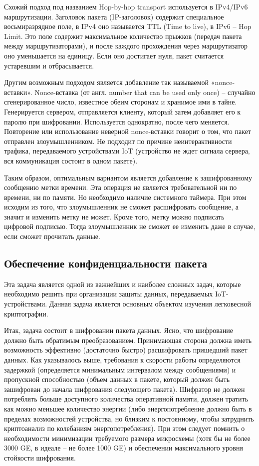 Схожий подход под названием Hop-by-hop transport \cite{src29} используется в IPv4/IPv6 маршрутизации. Заголовок пакета (IP-заголовок) содержит специальное восьмиразрядное поле, в IPv4 оно называется TTL (Time to live), в IPv6 – Hop Limit. Это поле содержит максимальное количество прыжков (передач пакета между маршрутизаторами), и после каждого прохождения через маршрутизатор оно уменьшается на единицу. Если оно достигает нуля, пакет считается устаревшим и отбрасывается.

Другим возможным подходом является добавление так называемой «nonce-вставки». Nonce-вставка (от англ. number that can be used only once) – случайно сгенерированное число, известное обеим сторонам и хранимое ими в тайне. Генерируется сервером, отправляется клиенту, который затем добавляет его к паролю при шифровании. Используется однократно, после чего меняется. Повторение или использование неверной nonce-вставки говорит о том, что пакет отправлен злоумышленником. Не подходит по причине неинтерактивности трафика, передаваемого устройствами IoT (устройство не ждет сигнала сервера, вся коммуникация состоит в одном пакете).

Таким образом, оптимальным вариантом является добавление к зашифрованному сообщению метки времени. Эта операция не является требовательной ни по времени, ни по памяти. Но необходимо наличие системного таймера. При этом исходим из того, что злоумышленник не сможет расшифровать сообщение, а значит и изменить метку не может. Кроме того, метку можно подписать цифровой подписью. Тогда злоумышленник не сможет ее изменить даже в случае, если сможет прочитать данные.

\subsection{Обеспечение конфиденциальности пакета}

Эта задача является одной из важнейших и наиболее сложных задач, которые необходимо решить при организации защиты данных, передаваемых IoT-устройствами. Данная задача является основным объектом изучения легковесной криптографии.

Итак, задача состоит в шифровании пакета данных. Ясно, что шифрование должно быть обратимым преобразованием. Принимающая сторона должна иметь возможность эффективно (достаточно быстро) расшифровать пришедший пакет данных. Как указывалось выше, требования к скорости работы определяются задержкой (определяется минимальным интервалом между сообщениями) и пропускной способностью (объем данных в пакете, который должен быть зашифрован до начала шифрования следующего пакета). Шифратор не должен потреблять больше доступного количества оперативной памяти, должен тратить как можно меньшее количество энергии (либо энергопотребление должно быть в пределах возможностей устройства, но близким к постоянному, чтобы затруднить криптоанализ по колебаниям энергопотребления). При этом следует помнить о необходимости минимизации требуемого размера микросхемы (хотя бы не более 3000 GE, в идеале – не более 1000 GE) и обеспечении максимального уровня стойкости шифрования.

